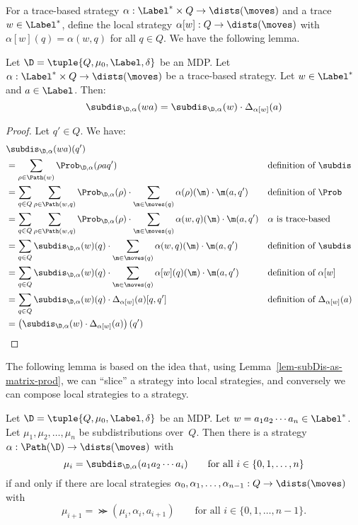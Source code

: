 For a trace-based strategy $\alpha : \Label^{*} \times Q \to \dists(\moves)$ and a trace $w \in \Label^*$,
define the local strategy $\alpha[w] : Q \to \dists(\moves)$ with $\alpha[w](q) = \alpha(w,q)$ for all $q \in Q$.
We have the following lemma.
\begin{lem}\label{lem-subDis-as-matrix-prod}
Let $\D = \tuple{Q,\mu_0,\Label,\delta}$ be an MDP\@.
Let $\alpha : \Label^{*} \times Q \to \dists(\moves)$ be a trace-based strategy.
Let $w \in \Label^*$ and $a \in \Label$.
Then:
\[ \subdis_{\D,\alpha}(w a) = \subdis_{\D,\alpha}(w) \cdot \Delta_{\alpha[w]}(a)
\]
\end{lem}
\begin{proof}
Let $q' \in Q$.
We have:
\begin{align*}
& \subdis_{\D,\alpha}(w a)(q') \\
& = \sum_{\rho \in \Path(w)} \Prob_{\D,\alpha}(\rho a q')
 && \text{definition of $\subdis$} \\
& = \sum_{q \in Q} \sum_{\rho \in \Path(w,q)} \Prob_{\D,\alpha}(\rho) \cdot
     \sum_{\m \in \moves(q)} \alpha(\rho)(\m) \cdot \m(a,q')
 && \text{definition of $\Prob$} \\
& = \sum_{q \in Q} \sum_{\rho \in \Path(w,q)} \Prob_{\D,\alpha}(\rho) \cdot
     \sum_{\m \in \moves(q)} \alpha(w,q)(\m) \cdot \m(a,q')
 && \text{$\alpha$ is trace-based} \\
& = \sum_{q \in Q} \subdis_{\D,\alpha}(w)(q) \cdot
     \sum_{\m \in \moves(q)} \alpha(w,q)(\m) \cdot \m(a,q')
 && \text{definition of $\subdis$} \\
& = \sum_{q \in Q} \subdis_{\D,\alpha}(w)(q) \cdot
     \sum_{\m \in \moves(q)} \alpha[w](q)(\m) \cdot \m(a,q')
 && \text{definition of $\alpha[w]$} \\
& = \sum_{q \in Q} \subdis_{\D,\alpha}(w)(q) \cdot
     \Delta_{\alpha[w]}(a)[q,q']
 && \text{definition of $\Delta_{\alpha[w]}(a)$} \\
& = \left( \subdis_{\D,\alpha}(w) \cdot \Delta_{\alpha[w]}(a) \right) (q')
\tag*{\qedhere}
\end{align*}
\end{proof}

The following lemma is based on the idea that, using Lemma~\ref{lem-subDis-as-matrix-prod}, we can ``slice'' a strategy into local strategies, and conversely we can compose local strategies to a strategy.
\begin{lem}\label{lem-link-trace-local}
Let $\D = \tuple{Q,\mu_0,\Label,\delta}$ be an MDP\@.
Let $w = a_1 a_2 \cdots a_n \in \Label^*$.
Let $\mu_1, \mu_2, \ldots, \mu_n$ be subdistributions over~$Q$.
Then there is a strategy $\alpha : \Path(\D) \to \dists(\moves)$ with
\[
 \mu_i = \subdis_{\D,\alpha}(a_1 a_2 \cdots a_i) \qquad \text{for all $i \in \{0, 1, \ldots, n\}$}
\]
if and only if there are local strategies $\alpha_0, \alpha_1, \ldots, \alpha_{n-1} : Q \to \dists(\moves)$ with
\[
 \mu_{i+1} = \Succ(\mu_i, \alpha_i, a_{i+1}) \qquad \text{for all $i \in \{0, 1, \ldots, n-1\}$}.
\]
\end{lem}

